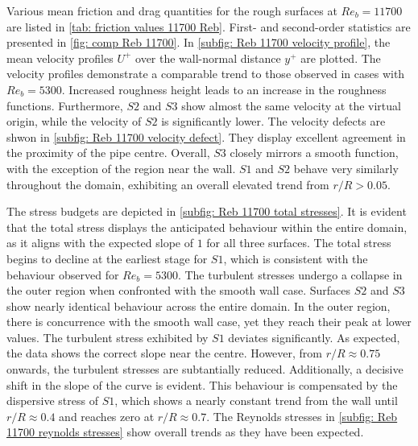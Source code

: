 Various mean friction and drag quantities for the rough surfaces at $Re_b = 11700$ are listed in 
\autoref{tab: friction values 11700 Reb}.
First- and second-order statistics are presented in \autoref{fig: comp Reb 11700}.
In \autoref{subfig: Reb 11700 velocity profile}, the mean velocity profiles $U^+$ over the wall-normal distance $y^+$ are plotted.
The velocity profiles demonstrate a comparable trend to those observed in cases with  $Re_b = 5300$.
Increased roughness height leads to an increase in the roughness functions.
Furthermore, $S2$ and $S3$ show almost the same velocity at the virtual origin, while the velocity of $S2$ is significantly lower.
The velocity defects are shwon in \autoref{subfig: Reb 11700 velocity defect}.  They display  excellent agreement in the proximity of the pipe centre.
Overall, $S3$ closely mirrors a smooth function, with the exception of the region near the wall.
$S1$ and $S2$ behave very similarly throughout the domain, exhibiting an overall elevated trend from $r/R > 0.05$.



The stress budgets are depicted in \autoref{subfig: Reb 11700 total stresses}.
It is evident that the total stress displays the anticipated behaviour within  the entire domain, as it aligns with the expected slope of $1$ for all three surfaces.
The total stress begins to decline at the earliest stage for $S1$, which  is consistent with the behaviour observed for $Re_b = 5300$.
The turbulent stresses undergo a collapse  in the outer region when confronted with the smooth wall case.
Surfaces $S2$ and $S3$ show nearly identical behaviour across the entire domain.
In the outer region, there is concurrence  with the smooth wall case, yet they reach their peak at lower values.
The turbulent stress exhibited by $S1$ deviates significantly.
As expected, the data shows the correct slope near the centre. However,   from $r/R \approx 0.75$ onwards, the turbulent stresses are subtantially reduced.
Additionally, a decisive shift in the slope of the curve is evident.
This behaviour is compensated by the dispersive stress of $S1$, which shows a nearly constant trend from the wall until $r/R \approx 0.4$ and reaches zero at $r/R \approx 0.7$.
The Reynolds stresses in \autoref{subfig: Reb 11700 reynolds stresses} show overall  trends as they  have been expected.

